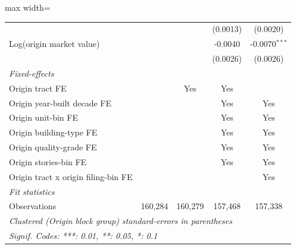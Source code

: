 \documentclass[
  11pt,
]{article}
\begin{document}
\begin{adjustbox}{max width=\textwidth}
\begin{tabular}{lcccc}
                                                  &                &              & (0.0013)        & (0.0020)\\   
   Log(origin market value)                       &                &              & -0.0040         & -0.0070$^{***}$\\   
                                                  &                &              & (0.0026)        & (0.0026)\\   
   \midrule
   \emph{Fixed-effects}\\
   Origin tract FE                                &                & Yes          & Yes             & \\  
   Origin year-built decade FE                    &                &              & Yes             & Yes\\  
   Origin unit-bin FE                             &                &              & Yes             & Yes\\  
   Origin building-type FE                        &                &              & Yes             & Yes\\  
   Origin quality-grade FE                        &                &              & Yes             & Yes\\  
   Origin stories-bin FE                          &                &              & Yes             & Yes\\  
   Origin tract x origin filing-bin FE            &                &              &                 & Yes\\  
   \midrule
   \emph{Fit statistics}\\
   Observations                                   & 160,284        & 160,279      & 157,468         & 157,338\\  
   \midrule \midrule
   \multicolumn{5}{l}{\emph{Clustered (Origin block group) standard-errors in parentheses}}\\
   \multicolumn{5}{l}{\emph{Signif. Codes: ***: 0.01, **: 0.05, *: 0.1}}\\
\end{tabular}
\par\endgroup

\end{adjustbox}
\end{document}
